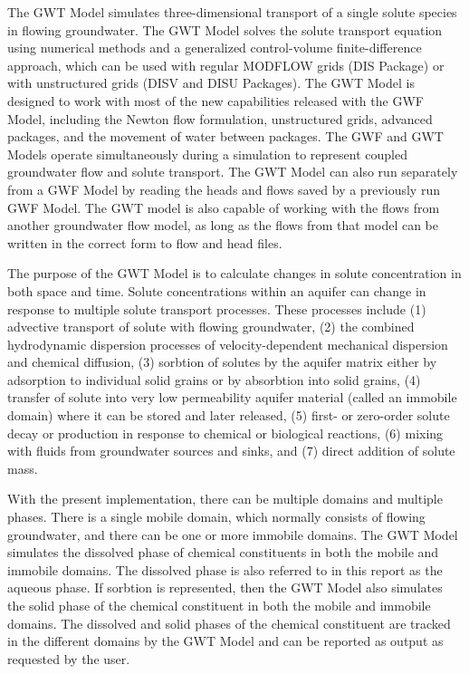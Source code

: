 The GWT Model simulates three-dimensional transport of a single solute species in flowing groundwater.  The GWT Model solves the solute transport equation using numerical methods and a generalized control-volume finite-difference approach, which can be used with regular MODFLOW grids (DIS Package) or with unstructured grids (DISV and DISU Packages).  The GWT Model is designed to work with most of the new capabilities released with the GWF Model, including the Newton flow formulation, unstructured grids, advanced packages, and the movement of water between packages.  The GWF and GWT Models operate simultaneously during a \mf simulation to represent coupled groundwater flow and solute transport.  The GWT Model can also run separately from a GWF Model by reading the heads and flows saved by a previously run GWF Model.  The GWT model is also capable of working with the flows from another groundwater flow model, as long as the flows from that model can be written in the correct form to flow and head files.  

The purpose of the GWT Model is to calculate changes in solute concentration in both space and time.  Solute concentrations within an aquifer can change in response to multiple solute transport processes.  These processes include (1) advective transport of solute with flowing groundwater, (2) the combined hydrodynamic dispersion processes of velocity-dependent mechanical dispersion and chemical diffusion, (3) sorbtion of solutes by the aquifer matrix either by adsorption to individual solid grains or by absorbtion into solid grains, (4) transfer of solute into very low permeability aquifer material (called an immobile domain) where it can be stored and later released, (5) first- or zero-order solute decay or production in response to chemical or biological reactions, (6) mixing with fluids from groundwater sources and sinks, and (7) direct addition of solute mass.

With the present implementation, there can be multiple domains and multiple phases.  There is a single mobile domain, which normally consists of flowing groundwater, and there can be one or more immobile domains.  The GWT Model simulates the dissolved phase of chemical constituents in both the mobile and immobile domains.  The dissolved phase is also referred to in this report as the aqueous phase.  If sorbtion is represented, then the GWT Model also simulates the solid phase of the chemical constituent in both the mobile and immobile domains.  The dissolved and solid phases of the chemical constituent are tracked in the different domains by the GWT Model and can be reported as output as requested by the user.

